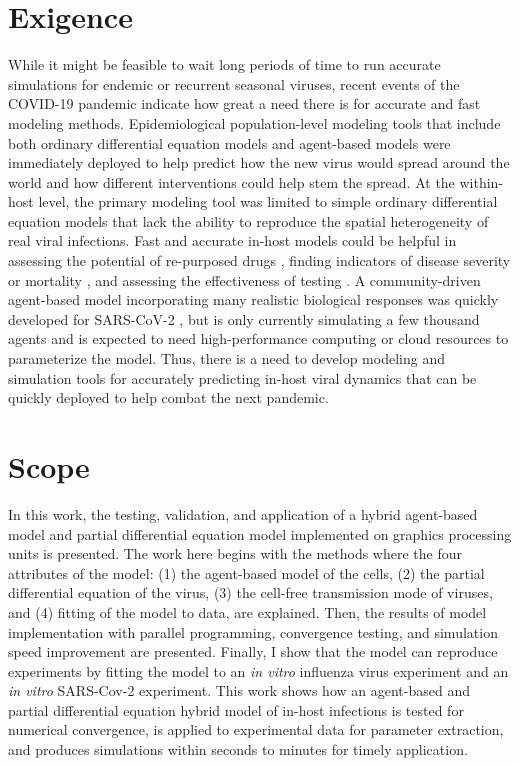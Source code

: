 \section{Exigence}
While it might be feasible to wait long periods of time to run accurate simulations for endemic or recurrent seasonal viruses, recent events of the COVID-19 pandemic indicate how great a need there is for accurate and fast modeling methods. Epidemiological population-level modeling tools that include both ordinary differential equation models \citep{li20,ngonghala20} and agent-based models \citep{ying21,sneppen21,kano21} were immediately deployed to help predict how the new virus would spread around the world and how different interventions could help stem the spread. At the within-host level, the primary modeling tool was limited to simple ordinary differential equation models \citep{goncalves20,wang20model,hernandez20,dogra20} that lack the ability to reproduce the spatial heterogeneity of real viral infections. Fast and accurate in-host models could be helpful in assessing the potential of re-purposed drugs \citep{czuppon21,goncalves20,dodds20}, finding indicators of disease severity or mortality \citep{neant21}, and assessing the effectiveness of testing \citep{ejima21}. A community-driven agent-based model incorporating many realistic biological responses was quickly developed for SARS-CoV-2 \citep{getz21}, but is only currently simulating a few thousand agents and is expected to need high-performance computing or cloud resources to parameterize the model. Thus, there is a need to develop modeling and simulation tools for accurately predicting in-host viral dynamics that can be quickly deployed to help combat the next pandemic.

\section{Scope}

In this work, the testing, validation, and application of a hybrid agent-based model and partial differential equation model implemented on graphics processing units is presented. The work here begins with the methods where the four attributes of the model: (1) the agent-based model of the cells, (2) the partial differential equation of the virus, (3) the cell-free transmission mode of viruses, and (4) fitting of the model to data, are explained.  Then, the results of model implementation with parallel programming, convergence testing, and simulation speed improvement are presented. Finally, I show that the model can reproduce experiments by fitting the model to an \emph{in vitro} influenza virus experiment and an \emph{in vitro} SARS-Cov-2 experiment. This work shows how an agent-based and partial differential equation hybrid model of in-host infections is tested for numerical convergence, is applied to experimental data for parameter extraction, and produces simulations within seconds to minutes for timely application. 





